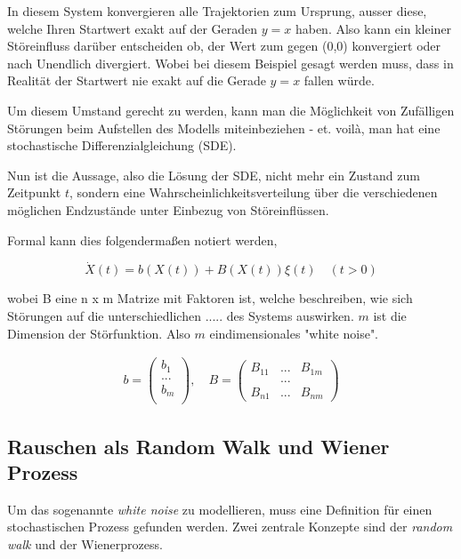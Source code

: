 In diesem System konvergieren alle Trajektorien zum Ursprung, ausser diese, welche Ihren Startwert exakt auf der Geraden $ y = x $ haben. Also kann ein kleiner Störeinfluss darüber entscheiden ob, der Wert zum gegen (0,0) konvergiert oder nach Unendlich divergiert. Wobei bei diesem Beispiel gesagt werden muss, dass in Realität der Startwert nie exakt auf die Gerade $ y = x $ fallen würde.




Um diesem Umstand gerecht zu werden, kann man die Möglichkeit von Zufälligen Störungen beim Aufstellen des Modells miteinbeziehen - et. voilà, man hat eine stochastische Differenzialgleichung (SDE).

Nun ist die Aussage, also die Lösung der SDE, nicht mehr ein Zustand zum Zeitpunkt $ t $, sondern eine Wahrscheinlichkeitsverteilung über die verschiedenen möglichen Endzustände unter Einbezug von Störeinflüssen.

Formal kann dies folgendermaßen notiert werden, 

\begin{equation}
\label{brown:SDGL:whiteNoise}
\dot{X}(t) = b(X(t)) + B(X(t))\xi(t) \quad (t>0)
\end{equation}

wobei B eine n x m Matrize mit Faktoren ist, welche beschreiben, wie sich Störungen auf die unterschiedlichen ..... des Systems auswirken. $ m $ ist die Dimension der Störfunktion. Also $ m $ eindimensionales "white noise".

\begin{align*}
		b = 
	\begin{pmatrix}
		b_{1} \\
		...\\
		b_{m}\\ 
	\end{pmatrix}
	, \quad
	B = 
	\begin{pmatrix}
		B_{11} & ... & B_{1m} \\
		& ... & \\
		B_{n1} & ... & B_{nm} 
	\end{pmatrix}
\end{align*}


\subsection{Rauschen als Random Walk und Wiener Prozess
\label{brown:SDGL:Wiener}}

Um das sogenannte \textit{white noise} zu modellieren, muss eine Definition für einen stochastischen Prozess gefunden werden. Zwei zentrale Konzepte sind der \textit{random walk} und der Wienerprozess.

